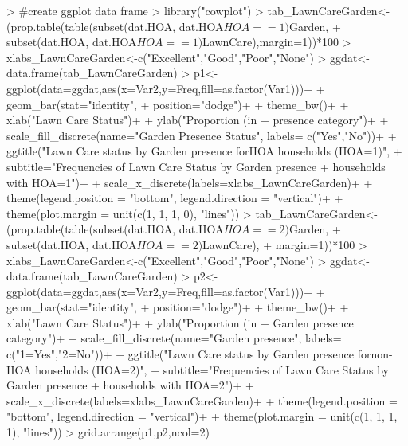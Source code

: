 \documentclass{article}
\begin{document}
\begin{Schunk}
\begin{Sinput}
> #create ggplot data frame
> library("cowplot") 
> tab_LawnCareGarden<-(prop.table(table(subset(dat.HOA, dat.HOA$HOA==1)$Garden,
+                         subset(dat.HOA, dat.HOA$HOA==1)$LawnCare),margin=1))*100
> xlabs_LawnCareGarden<-c("Excellent","Good","Poor","None")
> ggdat<-data.frame(tab_LawnCareGarden)
> p1<-ggplot(data=ggdat,aes(x=Var2,y=Freq,fill=as.factor(Var1)))+
+   geom_bar(stat="identity",
+            position="dodge")+
+   theme_bw()+
+   xlab("Lawn Care Status")+
+   ylab("Proportion (in %
+        presence category")+
+   scale_fill_discrete(name="Garden Presence Status", labels= c("Yes","No"))+
+   ggtitle("Lawn Care status by Garden presence for\nonly HOA households (HOA=1)",
+           subtitle="Frequencies of Lawn Care Status by Garden presence\nfor 
+           households with HOA=1")+
+   scale_x_discrete(labels=xlabs_LawnCareGarden)+
+   theme(legend.position = "bottom", legend.direction = "vertical")+
+   theme(plot.margin = unit(c(1, 1, 1, 0), "lines"))
> tab_LawnCareGarden<-(prop.table(table(subset(dat.HOA, dat.HOA$HOA==2)$Garden,
+                                        subset(dat.HOA, dat.HOA$HOA==2)$LawnCare),
+                                 margin=1))*100
> xlabs_LawnCareGarden<-c("Excellent","Good","Poor","None")
> ggdat<-data.frame(tab_LawnCareGarden)
> p2<-ggplot(data=ggdat,aes(x=Var2,y=Freq,fill=as.factor(Var1)))+
+   geom_bar(stat="identity",
+            position="dodge")+
+   theme_bw()+
+   xlab("Lawn Care Status")+
+   ylab("Proportion (in %
+        Garden presence category")+
+   scale_fill_discrete(name="Garden presence", labels= c("1=Yes","2=No"))+
+   ggtitle("Lawn Care status by Garden presence for\nonly non-HOA households (HOA=2)", 
+           subtitle="Frequencies of Lawn Care Status by Garden presence\nfor 
+           households with HOA=2")+
+   scale_x_discrete(labels=xlabs_LawnCareGarden)+
+   theme(legend.position = "bottom", legend.direction = "vertical")+
+   theme(plot.margin = unit(c(1, 1, 1, 1), "lines"))
> grid.arrange(p1,p2,ncol=2)
\end{Sinput}
\end{Schunk}
\end{document}
